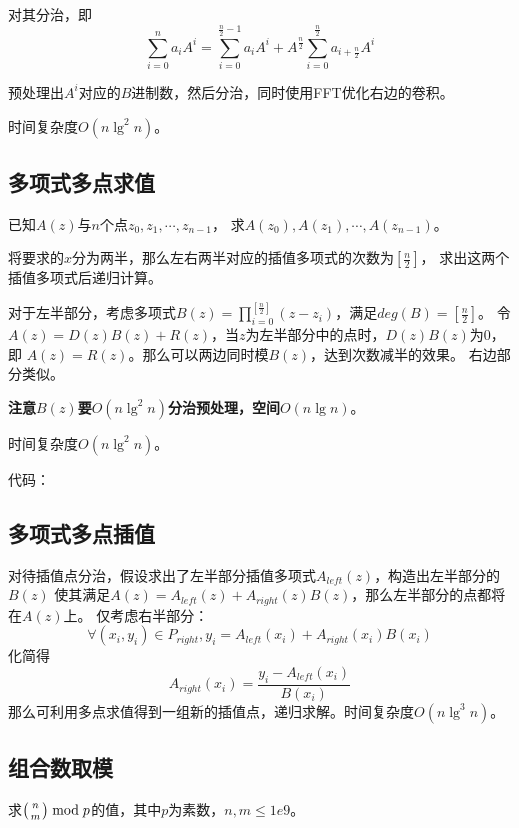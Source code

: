 对其分治，即
\begin{displaymath}
    \sum_{i=0}^n{a_iA^i}=\sum_{i=0}^{\frac{n}{2}-1}{a_iA^i}
    +A^{\frac{n}{2}}\sum_{i=0}^{\frac{n}{2}}{a_{i+\frac{n}{2}}A^i}
\end{displaymath}

预处理出$A^i$对应的$B$进制数，然后分治，同时使用FFT优化右边的卷积。

时间复杂度$O(n \lg^2 n)$。

\subsection{多项式多点求值}
已知$A(z)$与$n$个点$z_0,z_1,\cdots,z_{n-1}$，
求$A(z_0),A(z_1),\cdots,A(z_{n-1})$。

将要求的$x$分为两半，那么左右两半对应的插值多项式的次数为$[\frac{n}{2}]$，
求出这两个插值多项式后递归计算。

对于左半部分，考虑多项式$\displaystyle B(z)=\prod_{i=0}^
{[\frac{n}{2}]}(z-z_i)$，满足$deg(B)=[\frac{n}{2}]$。
令$A(z)=D(z)B(z)+R(z)$，当$z$为左半部分中的点时，$D(z)B(z)$为0，即
$A(z)=R(z)$。那么可以两边同时模$B(z)$，达到次数减半的效果。
右边部分类似。

{\bfseries 注意$B(z)$要$O(n\lg^2 n)$分治预处理，空间$O(n\lg n)$}。

时间复杂度$O(n\lg^2n)$。

代码：

\subsection{多项式多点插值}

对待插值点分治，假设求出了左半部分插值多项式$A_{left}(z)$，构造出左半部分的$B(z)$
使其满足$A(z)=A_{left}(z)+A_{right}(z)B(z)$，那么左半部分的点都将在$A(z)$上。
仅考虑右半部分：
\begin{displaymath}
    \forall(x_i,y_i)\in P_{right},y_i=A_{left}(x_i)+A_{right}(x_i)B(x_i)
\end{displaymath}
化简得
\begin{displaymath}
    A_{right}(x_i)=\frac{y_i-A_{left}(x_i)}{B(x_i)}
\end{displaymath}
那么可利用多点求值得到一组新的插值点，递归求解。时间复杂度$O(n \lg^3 n)$。

\subsection{组合数取模}

求$\left(n \atop m\right) \bmod{p}$的值，其中$p$为素数，$n,m\leq 1e9$。

